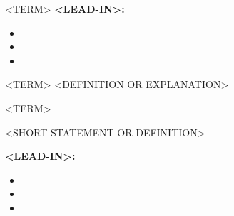 \documentclass[avery5388,grid,frame]{flashcards}
\begin{document}

 \begin{flashcard}[<CATEGORY>]{<TERM>}
  \medskip
  \textbf{<LEAD-IN>:}
  \begin{itemize}
   \item <ITEM 1>
   \item <ITEM 2>
   \item <ITEM 3>
  \end{itemize}
 \end{flashcard}

 \begin{flashcard}[<CATEGORY>]{<TERM>}\centering\vspace{\fill}
  <DEFINITION OR EXPLANATION>
  \vspace{\fill}
 \end{flashcard}

 \begin{flashcard}[<CATEGORY>]{<TERM>}\vspace{\fill}
  \begin{center}
    <SHORT STATEMENT OR DEFINITION>
  \end{center}
  \vspace{1em}
  \textbf{<LEAD-IN>:}
  \begin{itemize}
   \item <ITEM 1>
   \item <ITEM 2>
   \item <ITEM 3>
  \end{itemize}
  \vspace{\fill}
 \end{flashcard}
\end{document}
